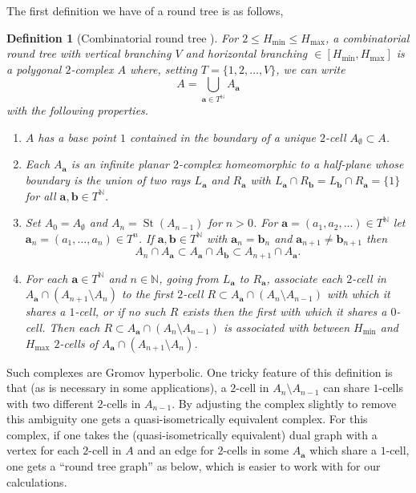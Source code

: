 \documentclass[11pt]{amsart}
\numberwithin{equation}{section}
\newtheorem{definition}[equation]{Definition}
\theoremstyle{citing}
\DeclareMathOperator{\St}{St}
\newcommand{\N}{\mathbb{N}}
\newcommand{\ba}{\mathbf{a}}
\newcommand{\bbb}{\mathbf{b}}
\numberwithin{equation}{section}
\begin{document}
The first definition we have of a round tree is as follows,
\begin{definition}[{Combinatorial round tree \cite[Definition 7.1]{Mac-16-confdim-subcplxs}}]
	\label{def:comb-round-tree-complex}
	For $2 \leq H_{\min} \leq H_{\max}$, a \emph{combinatorial round tree} with vertical branching $V$ and horizontal branching $\in [H_{\min}, H_{\max}]$ is a polygonal $2$-complex $A$ where, setting $T = \{1,2,\ldots, V\}$, we can write
	\[ A = \bigcup_{\ba \in T^\N} A_\ba \]
	with the following properties.
	\begin{enumerate}
		\item $A$ has a base point $1$ contained in the boundary of a unique $2$-cell $A_\emptyset \subset A$.
		\item Each $A_\ba$ is an infinite planar $2$-complex homeomorphic to a half-plane whose boundary is the union of two rays $L_\ba$ and $R_\ba$ with $L_\ba \cap R_\bbb = L_\bbb \cap R_\ba = \{1\}$ for all $\ba,\bbb \in T^\N$.
		\item Set $A_0 = A_\emptyset$ and $A_n = \St(A_{n-1})$ for $n>0$.  
			For $\ba=(a_1,a_2,\ldots) \in T^\N$ let $\ba_n = (a_1,\ldots,a_n) \in T^n$.
			If $\ba,\bbb \in T^\N$ with $\ba_n=\bbb_n$ and $\ba_{n+1}\neq \bbb_{n+1}$ then
			\[ 
				A_n \cap A_\ba \subset A_\ba \cap A_\bbb \subset A_{n+1}\cap A_\ba.
			\]
		\item
			For each $\ba \in T^\N$ and $n \in \N$, going from $L_\ba$ to $R_\ba$, associate each $2$-cell in $A_\ba \cap (A_{n+1}\setminus A_{n})$ to the first $2$-cell $R \subset A_\ba \cap (A_n\setminus A_{n-1})$ with which it shares a $1$-cell, or if no such $R$ exists then the first with which it shares a $0$-cell.  Then each $R \subset A_\ba \cap (A_n \setminus A_{n-1})$ is associated with between $H_{\min}$ and $H_{\max}$ $2$-cells of $A_\ba \cap (A_{n+1}\setminus A_{n})$.
	\end{enumerate}
\end{definition}
Such complexes are Gromov hyperbolic.
One tricky feature of this definition is that (as is necessary in some applications), a $2$-cell in $A_n\setminus A_{n-1}$ can share $1$-cells with two different $2$-cells in $A_{n-1}$.  By adjusting the complex slightly to remove this ambiguity one gets a quasi-isometrically equivalent complex.  For this complex, if one takes the (quasi-isometrically equivalent) dual graph with a vertex for each $2$-cell in $A$ and an edge for $2$-cells in some $A_\ba$ which share a $1$-cell, one gets a ``round tree graph'' as below, which is easier to work with for our calculations.  
\end{document}

